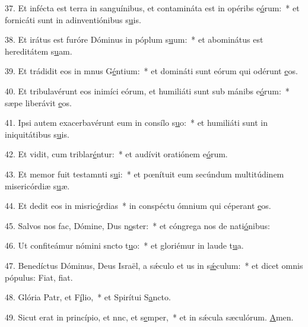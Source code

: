 37. Et infécta est terra in sanguínibus, et contamináta est in opéribs e\uline{ó}rum:~* et fornicáti sunt in adinventiónibus s\uline{u}is.\par 
38. Et irátus est furóre Dóminus in póplum s\uline{u}um:~* et abominátus est hereditátem s\uline{u}am.\par 
39. Et trádidit eos in mnus G\uline{é}ntium:~* et domináti sunt eórum qui odérunt \uline{e}os.\par 
40. Et tribulavérunt eos inimíci eórum, et humiliáti sunt sub mánibs e\uline{ó}rum:~* sæpe liberávit \uline{e}os.\par 
41. Ipsi autem exacerbavérunt eum in consílo s\uline{u}o:~* et humiliáti sunt in iniquitátibus s\uline{u}is.\par 
42. Et vidit, cum triblar\uline{é}ntur:~* et audívit oratiónem e\uline{ó}rum.\par 
43. Et memor fuit testamnti s\uline{u}i:~* et pœnítuit eum secúndum multitúdinem misericórdiæ s\uline{u}æ.\par 
44. Et dedit eos in misric\uline{ó}rdias~* in conspéctu ómnium qui céperant \uline{e}os.\par 
45. Salvos nos fac, Dómine, Dus n\uline{o}ster:~* et cóngrega nos de nati\uline{ó}nibus:\par 
46. Ut confiteámur nómini sncto t\uline{u}o:~* et gloriémur in laude t\uline{u}a.\par 
47. Benedíctus Dóminus, Deus Israël, a sǽculo et us in s\uline{ǽ}culum:~* et dicet omnis pópulus: Fiat, f\uline{i}at.\par 
48. Glória Patr, et F\uline{í}lio,~* et Spirítui S\uline{a}ncto.\par 
49. Sicut erat in princípio, et nnc, et s\uline{e}mper,~* et in sǽcula sæculórum. \uline{A}men.\par 
